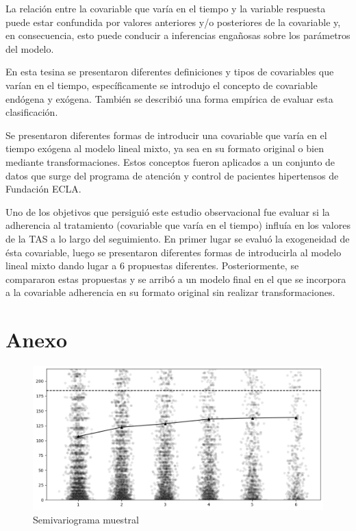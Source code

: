 \documentclass[spanish]{article}
\numberwithin{figure}{subsection}
\numberwithin{equation}{subsection}
\numberwithin{table}{subsection}
\begin{document}
La relación entre la covariable que varía en el tiempo y la variable respuesta
puede estar confundida por valores anteriores y/o posteriores de la covariable
y, en consecuencia, esto puede conducir a inferencias engañosas sobre los
parámetros del modelo.

En esta tesina se presentaron diferentes definiciones y tipos de covariables que
varían en el tiempo, específicamente se introdujo el concepto de covariable
endógena y exógena. También se describió una forma empírica de evaluar esta
clasificación.

Se presentaron diferentes formas de introducir una covariable que varía en el
tiempo exógena al modelo lineal mixto, ya sea en su formato original o bien
mediante transformaciones. Estos conceptos fueron aplicados a un conjunto de
datos que surge del programa de atención y control de pacientes hipertensos de
Fundación ECLA.

Uno de los objetivos que persiguió este estudio observacional fue evaluar si la
adherencia al tratamiento (covariable que varía en el tiempo) influía en los
valores de la TAS a lo largo del seguimiento. En primer lugar se evaluó la
exogeneidad de ésta covariable, luego se presentaron diferentes formas de
introducirla al modelo lineal mixto dando lugar a 6 propuestas diferentes.
Posteriormente, se compararon estas propuestas y se arribó a un modelo final en
el que se incorpora a la covariable adherencia en su formato original sin
realizar transformaciones.

\newpage

\section{Anexo}

\begin{figure}[H]
	\centering
	\includegraphics[scale=0.4]{img/semivariogram.png}
	\caption{Semivariograma muestral}
	\label{semivariogram}
\end{figure}
\end{document}
